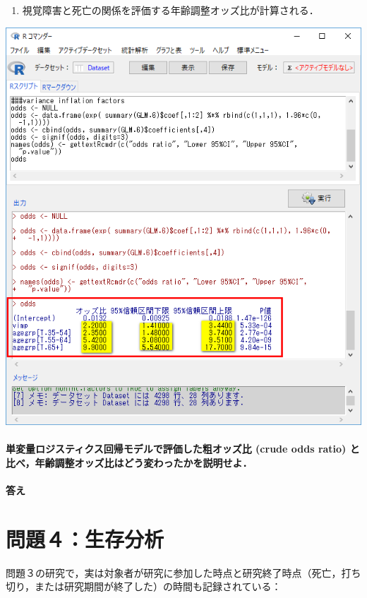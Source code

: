 \documentclass[11pt,]{problemset}
\providecommand{\tightlist}{%
  \setlength{\itemsep}{0pt}\setlength{\parskip}{0pt}}
\let\oldparagraph\paragraph
\renewcommand{\paragraph}[1]{\oldparagraph{#1}\mbox{}}
\begin{document}
\begin{enumerate}
\def\labelenumi{\arabic{enumi}.}
\setcounter{enumi}{3}
\tightlist
\item
  視覚障害と死亡の関係を評価する年齢調整オッズ比が計算される．
\end{enumerate}

\begin{center}\includegraphics[width=0.5\linewidth,height=0.5\textheight]{pic/mltlogstic07} \end{center}

\paragraph{単変量ロジスティクス回帰モデルで評価した粗オッズ比 (crude
odds ratio)
と比べ，年齢調整オッズ比はどう変わったかを説明せよ．}\label{-crude-odds-ratio-}

\paragraph{答え}\label{-7}

\newpage

\vfill

\section{問題４：生存分析}

問題３の研究で，実は対象者が研究に参加した時点と研究終了時点（死亡，打ち切り，または研究期間が終了した）の時間も記録されている：
\end{document}
